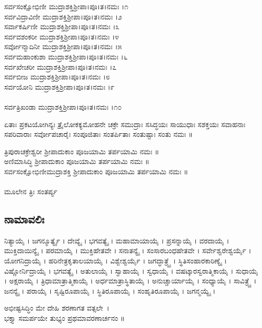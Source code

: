  ಸರ್ವಸಂಕ್ಷೋಭಿಣೀ ಮುದ್ರಾಶಕ್ತಿಶ್ರೀಪಾ।ಪೂ।ತ।ನಮಃ ।೧\\
 ಸರ್ವವಿದ್ರಾವಿಣೀ ಮುದ್ರಾಶಕ್ತಿಶ್ರೀಪಾ।ಪೂ।ತ।ನಮಃ ।೨\\
 ಸರ್ವಾಕರ್ಷಿಣೀ ಮುದ್ರಾಶಕ್ತಿಶ್ರೀಪಾ।ಪೂ।ತ।ನಮಃ ।೩\\
 ಸರ್ವವಶಂಕರೀ ಮುದ್ರಾಶಕ್ತಿಶ್ರೀಪಾ।ಪೂ।ತ।ನಮಃ ।೪\\
 ಸರ್ವೋನ್ಮಾದಿನೀ ಮುದ್ರಾಶಕ್ತಿಶ್ರೀಪಾ।ಪೂ।ತ।ನಮಃ ।೫\\
 ಸರ್ವಮಹಾಂಕುಶಾ ಮುದ್ರಾಶಕ್ತಿಶ್ರೀಪಾ।ಪೂ।ತ।ನಮಃ ।೬\\
 ಸರ್ವಖೇಚರೀ ಮುದ್ರಾಶಕ್ತಿಶ್ರೀಪಾ।ಪೂ।ತ।ನಮಃ ।೭\\
 ಸರ್ವಬೀಜ ಮುದ್ರಾಶಕ್ತಿಶ್ರೀಪಾ।ಪೂ।ತ।ನಮಃ ।೮\\
 ಸರ್ವಯೋನಿ ಮುದ್ರಾಶಕ್ತಿಶ್ರೀಪಾ।ಪೂ।ತ।ನಮಃ ।೯\\
\\ ಸರ್ವತ್ರಿಖಂಡಾ ಮುದ್ರಾಶಕ್ತಿಶ್ರೀಪಾ।ಪೂ।ತ।ನಮಃ ।೧೦

 ಏತಾಃ ಪ್ರಕಟಯೋಗಿನ್ಯಃ ತ್ರೈಲೋಕಕ್ಯಮೋಹನೇ ಚಕ್ರೇ ಸಮುದ್ರಾಃ ಸಸಿದ್ಧಯಃ ಸಾಯುಧಾಃ ಸಶಕ್ತಯಃ ಸವಾಹನಾಃ ಸಪರಿವಾರಾಃ ಸರ್ವೋಪಚಾರೈಃ ಸಂಪೂಜಿತಾಃ ಸಂತರ್ಪಿತಾಃ ಸಂತುಷ್ಟಾಃ ಸಂತು ನಮಃ ॥

 ತ್ರಿಪುರಾಚಕ್ರೇಶ್ವರೀ ಶ್ರೀಪಾದುಕಾಂ ಪೂಜಯಾಮಿ ತರ್ಪಯಾಮಿ ನಮಃ ॥\\
 ಅಣಿಮಾಸಿದ್ಧಿ ಶ್ರೀಪಾದುಕಾಂ ಪೂಜಯಾಮಿ ತರ್ಪಯಾಮಿ ನಮಃ ॥\\
 ಸರ್ವಸಂಕ್ಷೋಭಿಣೀಮುದ್ರಾಶಕ್ತಿ ಶ್ರೀಪಾದುಕಾಂ ಪೂಜಯಾಮಿ ತರ್ಪಯಾಮಿ ನಮಃ ॥\\
\\
ಮೂಲೇನ ತ್ರಿಃ ಸಂತರ್ಪ್ಯ
\subsection{ನಾಮಾವಲಿಃ}
ನಿತ್ಯಾಯೈ । ಜಗನ್ಮೂರ್ತ್ಯೈ । ದೇವ್ಯೈ । ಭಗವತ್ಯೈ । ಮಹಾಮಾಯಾಯೈ । ಪ್ರಸನ್ನಾಯೈ । ವರದಾಯೈ । ಮುಕ್ತಿದಾಯಿನ್ಯೈ । ಪರಮಾಯೈ । ಮುಕ್ತಿಹೇತವೇ । ಸನಾತನ್ಯೈ । ಸಂಸಾರಬಂಧಹೇತವೇ । ಸರ್ವೇಶ್ವರೇಶ್ವರ್ಯೈ । ಯೋಗನಿದ್ರಾಯೈ । ಹರಿನೇತ್ರಕೃತಾಲಯಾಯೈ । ವಿಶ್ವೇಶ್ವರ್ಯೈ । ಜಗದ್ಧಾತ್ರ್ಯೈ । ಸ್ಥಿತಿಸಂಹಾರಕಾರಿಣ್ಯೈ । ವಿಷ್ಣೋರ್ನಿದ್ರಾಯೈ । ಭಗವತ್ಯೈ । ಅತುಲಾಯೈ । ಸ್ವಾಹಾಯೈ । ಸ್ವಧಾಯೈ । ವಷಟ್ಕಾರಸ್ವರಾತ್ಮಿಕಾಯೈ । ಸುಧಾಯೈ । ಅಕ್ಷರಾಯೈ । ತ್ರಿಧಾಮಾತ್ರಾತ್ಮಿಕಾಯೈ । ಅರ್ಧಮಾತ್ರಾಸ್ಥಿತಾಯೈ । ಅನುಚ್ಚಾರ್ಯಾಯೈ । ಸಂಧ್ಯಾಯೈ । ಸಾವಿತ್ರ್ಯೈ । ಜನನ್ಯೈ । ಪರಾಯೈ । ಸೃಷ್ಟಿರೂಪಾಯೈ । ಸ್ಥಿತಿರೂಪಾಯೈ । ಸಂಹೃತಿರೂಪಾಯೈ । ಜಗನ್ಮಯ್ಯೈ । \\

 ಅಭೀಷ್ಟಸಿದ್ಧಿಂ ಮೇ ದೇಹಿ ಶರಣಾಗತ ವತ್ಸಲೇ~।\\
ಭಕ್ತ್ಯಾ ಸಮರ್ಪಯೇ ತುಭ್ಯಂ ಪ್ರಥಮಾವರಣಾರ್ಚನಂ ॥

